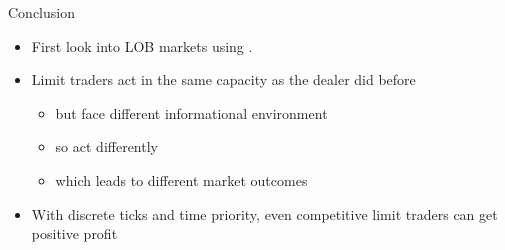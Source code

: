 \documentclass[english,10pt
,aspectratio=169
]{beamer}
\begin{document}
%
%


\begin{frame}{Conclusion}
	\begin{itemize}
		\item First look into LOB markets using \cite{glosten_is_1994}.
		\item Limit traders act in the same capacity as the dealer did before
		\begin{itemize}
			\item but face different \alert{informational environment}
			\item so act differently
			\item which leads to different market outcomes
		\end{itemize}
		\item With discrete ticks and time priority, even competitive limit traders can get positive profit
	\end{itemize}
\end{frame}
\end{document}
